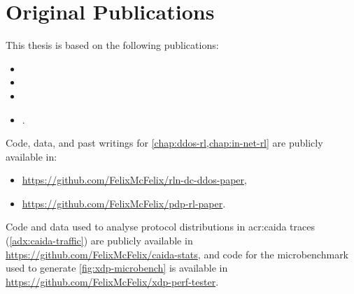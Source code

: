 \chapter*{Original Publications}

This thesis is based on the following publications:
{
\renewcommand*{\mkbibnamefamily}[1]{\textsc{#1}}
\renewcommand*{\mkbibnameprefix}[1]{\textsc{#1}}
\begin{itemize}
	\item {}
	\item {}
	\item {}
	\item {}.
\end{itemize}
}

Code, data, and past writings for \cref{chap:ddos-rl,chap:in-net-rl} are publicly available in:
\begin{itemize}
	\item \url{https://github.com/FelixMcFelix/rln-dc-ddos-paper},
	\item \url{https://github.com/FelixMcFelix/pdp-rl-paper}.
\end{itemize}

Code and data used to analyse protocol distributions in \gls{acr:caida} traces (\cref{adx:caida-traffic}) are publicly available in \url{https://github.com/FelixMcFelix/caida-stats}, and code for the microbenchmark used to generate \cref{fig:xdp-microbench} is available in \url{https://github.com/FelixMcFelix/xdp-perf-tester}.